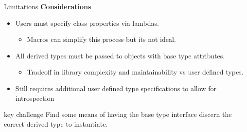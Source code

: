 \begin{frame}{Limitations}
    \textbf{Considerations}
    \begin{itemize}
        \item Users must specify class properties via lambdas. 
        \begin{itemize}
            \item Macros can simplify this process but its not ideal.
        \end{itemize}
        \pause
        \item All derived types must be passed to objects with base type attributes.
        \begin{itemize}
            \item Tradeoff in library complexity and maintainability vs user defined types. 
        \end{itemize} 
        \pause
        \item Still requires additional user defined type specifications to allow for introspection
    \end{itemize}
    \pause
    \begin{block}{key challenge}
        Find some means of having the base type interface discern the correct derived type to instantiate.
    \end{block}
\end{frame}
    